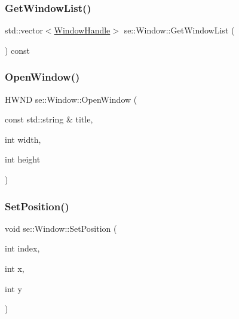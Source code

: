 \mbox{\label{classse_1_1_window_a3469863d327e48f06837f772d066e1e7}} 
\subsubsection{\texorpdfstring{Get\+Window\+List()}{GetWindowList()}}
{\footnotesize\ttfamily std\+::vector$<$\mbox{\hyperlink{structse_1_1_window_handle}{Window\+Handle}}$>$ se\+::\+Window\+::\+Get\+Window\+List (\begin{DoxyParamCaption}{ }\end{DoxyParamCaption}) const}

\mbox{\label{classse_1_1_window_a0bc98ce202ef1c431fe2780d53dbe7da}} 
\subsubsection{\texorpdfstring{Open\+Window()}{OpenWindow()}}
{\footnotesize\ttfamily H\+W\+ND se\+::\+Window\+::\+Open\+Window (\begin{DoxyParamCaption}\item[{const std\+::string \&}]{title,  }\item[{int}]{width,  }\item[{int}]{height }\end{DoxyParamCaption})}

\mbox{\label{classse_1_1_window_a12c371c25615c9d4744a961dab9d949c}} 
\subsubsection{\texorpdfstring{Set\+Position()}{SetPosition()}}
{\footnotesize\ttfamily void se\+::\+Window\+::\+Set\+Position (\begin{DoxyParamCaption}\item[{int}]{index,  }\item[{int}]{x,  }\item[{int}]{y }\end{DoxyParamCaption})}

